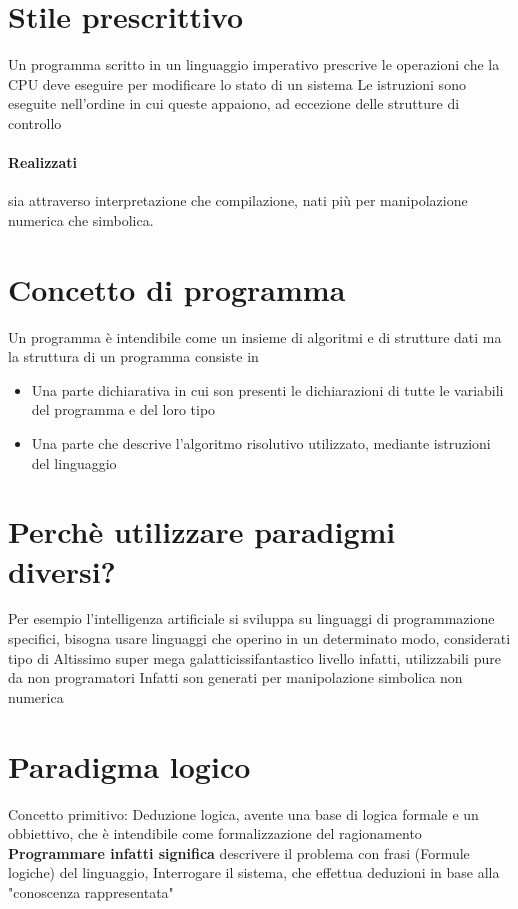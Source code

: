 \documentclass[12pt, a4paper, openany, oneside]{book}
\begin{document}
\section{Stile prescrittivo}
Un programma scritto in un linguaggio imperativo prescrive le operazioni che
la CPU deve eseguire per modificare lo stato di un sistema \newline \newline
Le istruzioni sono eseguite nell'ordine in cui queste appaiono, ad eccezione
delle strutture di controllo
\paragraph{Realizzati} sia attraverso interpretazione che compilazione, nati
più per manipolazione numerica che simbolica.
\newline
\section{Concetto di programma}
Un programma è intendibile come un insieme di algoritmi e di strutture dati
ma la struttura di un programma consiste in
\begin{itemize}
	\item Una parte dichiarativa in cui son presenti le dichiarazioni di tutte
	le variabili del programma e del loro tipo
	\item Una parte che descrive l'algoritmo risolutivo utilizzato, mediante istruzioni del linguaggio	
\end{itemize}
\section{Perchè utilizzare paradigmi diversi?}
Per esempio l'intelligenza artificiale si sviluppa su linguaggi di 
programmazione specifici, bisogna usare linguaggi che operino in un 
determinato modo, considerati tipo di Altissimo super mega galatticissifantastico livello infatti, utilizzabili pure da non programatori
\newline \newline
Infatti son generati per manipolazione simbolica non numerica 
\section{Paradigma logico}
Concetto primitivo: Deduzione logica, avente una base di logica formale e un 
obbiettivo, che è intendibile come formalizzazione del ragionamento
\newline \newline
\textbf{Programmare infatti significa} descrivere il problema con frasi 
(Formule logiche) del linguaggio, \newline
Interrogare il sistema, che effettua deduzioni in base alla "conoscenza 
rappresentata" 
\end{document}
